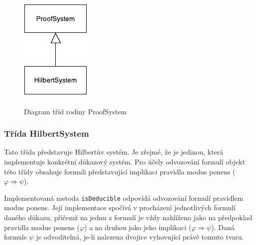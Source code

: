 \documentclass[thesis=B,czech,hidelinks]{thesis}[2012/06/26]
\begin{document}
\begin{figure}
\centering
\caption{Diagram tříd rodiny ProofSystem}
\includegraphics[width=\linewidth]{diagrams/proof_system}
\label{fig:proof_system}
\end{figure}

\subsubsection{Třída HilbertSystem}

Tato třída představuje Hilbertův systém. Je zřejmé, že je jedinou, která implementuje konkrétní důkazový systém. Pro účely odvozování formulí objekt této třídy obsahuje formuli představující implikaci pravidla modus ponens ($\varphi \Rightarrow \psi$).

Implementovaná metoda \texttt{isDeducible} odpovídá odvozování formulí pravidlem modus ponens. Její implementace spočívá v procházení jednotlivých formulí daného důkazu, přičemž na jednu z formulí je vždy nahlíženo jako na předpoklad pravidla modus ponens ($\varphi$) a na druhou jako jeho implikaci ($\varphi \Rightarrow \psi$). Daná formule $\psi$ je odvoditelná, je-li nalezena dvojice vyhovující právě tomuto tvaru.
\end{document}
